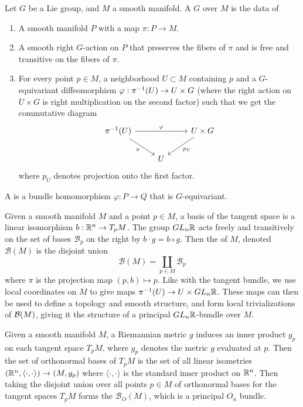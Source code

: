 \begin{defn}
Let $G$ be a Lie group, and $M$ a smooth manifold. A  $G$
over $M$ is the data of
%
\begin{enumerate}
\item A smooth manifold $P$ with a map $\pi : P \to M$.
\item A smooth right $G$-action on $P$ that preserves the fibers of $\pi$ and
is free and transitive on the fibers of $\pi$.
\item For every point $p \in M$, a neighborhood $U \subset M$ containing $p$ and
a $G$-equivariant diffeomorphism $\varphi: \pi^{-1}(U) \to U \times G$ (where
the right action on $U \times G$ is right multiplication on the second factor)
such that we get the commutative diagram
\[\begin{tikzcd}
\pi\inv(U) \ar[dr, "\pi"']\ar[rr, "\varphi"]&& U \times G \ar[dl, "p_U"]\\
& U
\end{tikzcd}\]
where $p_U$ denotes projection onto the first factor.
\end{enumerate}
A  is a bundle homomorphism $\varphi : P \to Q$
that is $G$-equivariant.
\end{defn}
%
\begin{exmp}
Given a smooth manifold $M$ and a point $p \in M$, a basis of the
tangent space is a linear isomorphism $b : \mathbb{R}^n \to T_pM$. The group
$GL_n\mathbb{R}$ acts freely and transitively on the set of bases $\mathcal{B}_p$ on the right by
$b \cdot g = b \circ g$. Then the  of $M$, denoted
$\mathcal{B}(M)$ is the disjoint union
\[
\mathcal{B}(M) = \coprod_{p \in M}\mathcal{B}_p
\]
where $\pi$ is the projection map $(p,b) \mapsto p$. Like with the tangent
bundle, we use local coordinates on $M$ to give maps $\pi^{-1}(U) \to U \times GL_n\mathbb{R}$.
These maps can then be used to define a topology and smooth structure, and
form local trivializations of $\mathcal{B}(M)$, giving it the structure of a principal
$GL_n\mathbb{R}$-bundle over $M$.
\end{exmp}
%
\begin{exmp}
Given a smooth manifold $M$, a Riemannian metric $g$ induces an inner product
$g_p$ on each tangent space $T_pM$, where $g_p$ denotes the metric $g$ evaluated
at $p$. Then the set of orthonormal bases of $T_pM$ is the
set of all linear isometries $(\mathbb{R}^n, \langle\cdot,\cdot\rangle) \to (M, g_p)$
where $\langle\cdot,\cdot\rangle$ is the standard inner product on $\mathbb{R}^n$.
Then taking the disjoint union over all points $p\in M$ of orthonormal bases
for the tangent spaces $T_pM$ forms the 
$\mathcal{B}_O(M)$, which is a principal $O_n$ bundle.
\end{exmp}
